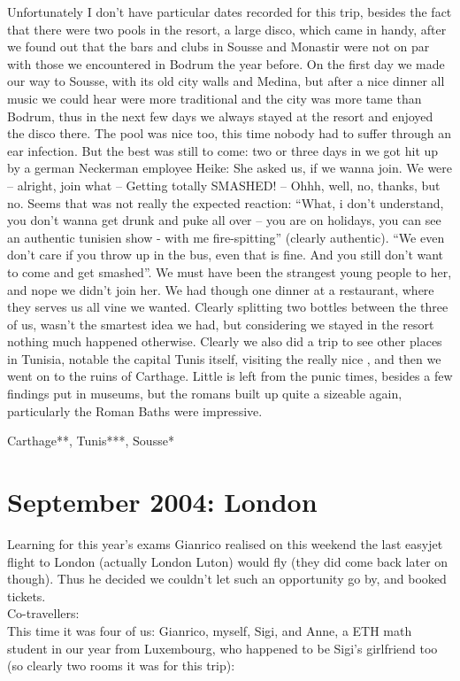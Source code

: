Unfortunately I don't have particular dates recorded for this trip, besides the fact that there were two pools in the resort, a large disco, which came in handy, after we found out that the bars and clubs in Sousse and Monastir were not on par with those we encountered in Bodrum the year before. On the first day we made our way to Sousse, with its old city walls and Medina, but after a nice dinner all music we could hear were more traditional and the city was more tame than Bodrum, thus in the next few days we always stayed at the resort and enjoyed the disco there. The pool was nice too, this time nobody had to suffer through an ear infection. But the best was still to come: two or three days in we got hit up by a german Neckerman employee Heike: She asked us, if we wanna join. We were -- alright, join what -- Getting totally SMASHED! -- Ohhh, well, no, thanks, but no. Seems that was not really the expected reaction: ``What, i don't understand, you don't wanna get drunk and puke all over -- you are on holidays, you can see an authentic tunisien show - with me fire-spitting'' (clearly authentic). ``We even don't care if you throw up in the bus, even that is fine. And you still don't want to come and get smashed''. We must have been the strangest young people to her, and nope we didn't join her. We had though one dinner at a restaurant, where they serves us all vine we wanted. Clearly splitting two bottles between the three of us, wasn't the smartest idea we had, but considering we stayed in the resort nothing much happened otherwise. Clearly we also did a trip to see other places in Tunisia, notable the capital Tunis itself, visiting the really nice , and then we went on to the ruins of Carthage. Little is left from the punic times, besides a few findings put in museums, but the romans built up quite a sizeable again, particularly the Roman Baths were impressive.

Carthage**, Tunis***, Sousse*

\section{September 2004: London}
\label{2004:London}

Learning for this year's exams Gianrico realised on this weekend the last easyjet flight to London (actually London Luton) would fly (they did come back later on though). Thus he decided we couldn't let such an opportunity go by, and booked tickets.\\

Co-travellers:\\
This time it was four of us: Gianrico, myself, Sigi, and Anne, a ETH math student in our year from Luxembourg, who happened to be Sigi's girlfriend too (so clearly two rooms it was for this trip):\\


